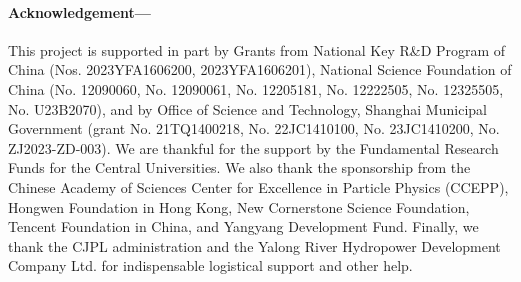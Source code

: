 

\paragraph{Acknowledgement—}
This project is supported in part by Grants from National Key R\&D Program of China (Nos. 2023YFA1606200, 2023YFA1606201), National Science Foundation of China (No. 12090060, No. 12090061, No. 12205181, No. 12222505, No. 12325505, No. U23B2070), and by Office of Science and Technology, Shanghai Municipal Government (grant No. 21TQ1400218, No. 22JC1410100, No. 23JC1410200, No. ZJ2023-ZD-003). We are thankful for the support by the Fundamental Research Funds for the Central Universities. We also thank the sponsorship from the Chinese Academy of Sciences Center for Excellence in Particle Physics (CCEPP), Hongwen Foundation in Hong Kong, New Cornerstone Science Foundation, Tencent Foundation in China, and Yangyang Development Fund. Finally, we thank the CJPL administration and the Yalong River Hydropower Development Company Ltd. for indispensable logistical support and other help. 
